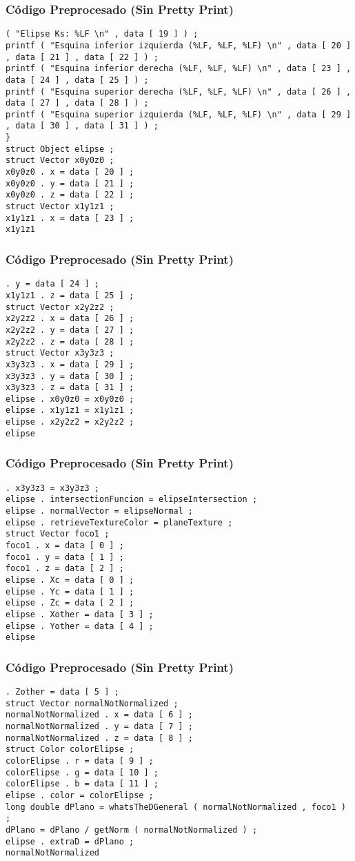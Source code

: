 \documentclass{beamer}
\begin{document}
\begin{frame}[fragile]
\frametitle{C\'odigo Preprocesado (Sin Pretty Print)}
\begin{lstlisting}[style=CStyle]
( "Elipse Ks: %LF \n" , data [ 19 ] ) ; 
printf ( "Esquina inferior izquierda (%LF, %LF, %LF) \n" , data [ 20 ] , data [ 21 ] , data [ 22 ] ) ; 
printf ( "Esquina inferior derecha (%LF, %LF, %LF) \n" , data [ 23 ] , data [ 24 ] , data [ 25 ] ) ; 
printf ( "Esquina superior derecha (%LF, %LF, %LF) \n" , data [ 26 ] , data [ 27 ] , data [ 28 ] ) ; 
printf ( "Esquina superior izquierda (%LF, %LF, %LF) \n" , data [ 29 ] , data [ 30 ] , data [ 31 ] ) ; 
} 
struct Object elipse ; 
struct Vector x0y0z0 ; 
x0y0z0 . x = data [ 20 ] ; 
x0y0z0 . y = data [ 21 ] ; 
x0y0z0 . z = data [ 22 ] ; 
struct Vector x1y1z1 ; 
x1y1z1 . x = data [ 23 ] ; 
x1y1z1 \end{lstlisting}
\end{frame}
\begin{frame}[fragile]
\frametitle{C\'odigo Preprocesado (Sin Pretty Print)}
\begin{lstlisting}[style=CStyle]
. y = data [ 24 ] ; 
x1y1z1 . z = data [ 25 ] ; 
struct Vector x2y2z2 ; 
x2y2z2 . x = data [ 26 ] ; 
x2y2z2 . y = data [ 27 ] ; 
x2y2z2 . z = data [ 28 ] ; 
struct Vector x3y3z3 ; 
x3y3z3 . x = data [ 29 ] ; 
x3y3z3 . y = data [ 30 ] ; 
x3y3z3 . z = data [ 31 ] ; 
elipse . x0y0z0 = x0y0z0 ; 
elipse . x1y1z1 = x1y1z1 ; 
elipse . x2y2z2 = x2y2z2 ; 
elipse \end{lstlisting}
\end{frame}
\begin{frame}[fragile]
\frametitle{C\'odigo Preprocesado (Sin Pretty Print)}
\begin{lstlisting}[style=CStyle]
. x3y3z3 = x3y3z3 ; 
elipse . intersectionFuncion = elipseIntersection ; 
elipse . normalVector = elipseNormal ; 
elipse . retrieveTextureColor = planeTexture ; 
struct Vector foco1 ; 
foco1 . x = data [ 0 ] ; 
foco1 . y = data [ 1 ] ; 
foco1 . z = data [ 2 ] ; 
elipse . Xc = data [ 0 ] ; 
elipse . Yc = data [ 1 ] ; 
elipse . Zc = data [ 2 ] ; 
elipse . Xother = data [ 3 ] ; 
elipse . Yother = data [ 4 ] ; 
elipse \end{lstlisting}
\end{frame}
\begin{frame}[fragile]
\frametitle{C\'odigo Preprocesado (Sin Pretty Print)}
\begin{lstlisting}[style=CStyle]
. Zother = data [ 5 ] ; 
struct Vector normalNotNormalized ; 
normalNotNormalized . x = data [ 6 ] ; 
normalNotNormalized . y = data [ 7 ] ; 
normalNotNormalized . z = data [ 8 ] ; 
struct Color colorElipse ; 
colorElipse . r = data [ 9 ] ; 
colorElipse . g = data [ 10 ] ; 
colorElipse . b = data [ 11 ] ; 
elipse . color = colorElipse ; 
long double dPlano = whatsTheDGeneral ( normalNotNormalized , foco1 ) ; 
dPlano = dPlano / getNorm ( normalNotNormalized ) ; 
elipse . extraD = dPlano ; 
normalNotNormalized \end{lstlisting}
\end{frame}
\end{document}
